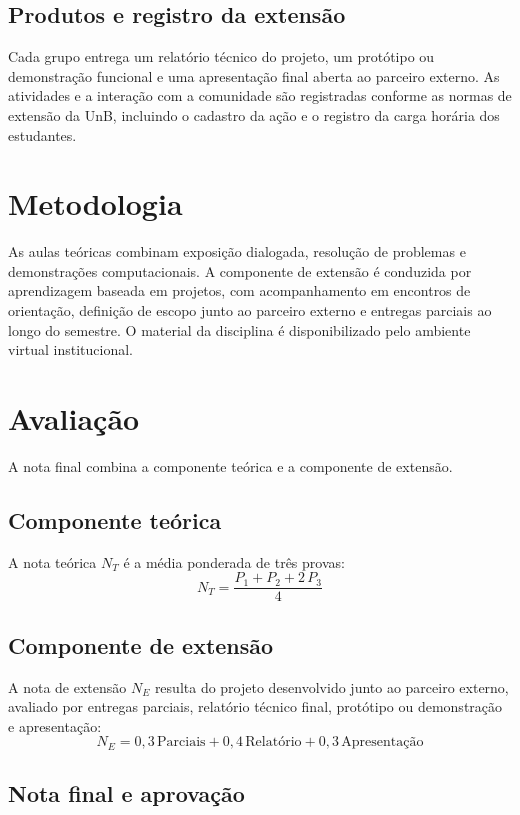 \documentclass[11pt,a4paper]{article}
\begin{document}
\subsection*{Produtos e registro da extensão}

Cada grupo entrega um relatório técnico do projeto, um protótipo ou demonstração funcional e uma apresentação final aberta ao parceiro externo. As atividades e a interação com a comunidade são registradas conforme as normas de extensão da UnB, incluindo o cadastro da ação e o registro da carga horária dos estudantes.

\section{Metodologia}

As aulas teóricas combinam exposição dialogada, resolução de problemas e demonstrações computacionais. A componente de extensão é conduzida por aprendizagem baseada em projetos, com acompanhamento em encontros de orientação, definição de escopo junto ao parceiro externo e entregas parciais ao longo do semestre. O material da disciplina é disponibilizado pelo ambiente virtual institucional.

\section{Avaliação}

A nota final combina a componente teórica e a componente de extensão.

\subsection*{Componente teórica}

A nota teórica $N_T$ é a média ponderada de três provas:
\[
N_T = \frac{P_1 + P_2 + 2\,P_3}{4}
\]

\subsection*{Componente de extensão}

A nota de extensão $N_E$ resulta do projeto desenvolvido junto ao parceiro externo, avaliado por entregas parciais, relatório técnico final, protótipo ou demonstração e apresentação:
\[
N_E = 0{,}3\,\text{Parciais} + 0{,}4\,\text{Relatório} + 0{,}3\,\text{Apresentação}
\]

\subsection*{Nota final e aprovação}
\end{document}
